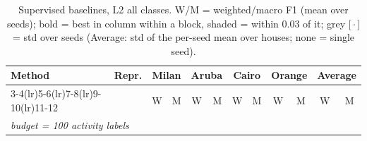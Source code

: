 \begin{table}[H]
\centering\small
\caption{Supervised baselines, L2 all classes. W/M = weighted/macro F1 (mean over seeds); bold = best in column within a block, shaded = within 0.03 of it; grey [\,$\cdot$\,] = std over seeds (Average: std of the per-seed mean over houses; none = single seed).}
\label{tab:base_l2_all}
\setlength{\tabcolsep}{3.2pt}
\begin{tabular}{llcc|cc|cc|cc|cc}
\toprule
Method & Repr. & \multicolumn{2}{c}{Milan} & \multicolumn{2}{c}{Aruba} & \multicolumn{2}{c}{Cairo} & \multicolumn{2}{c}{Orange} & \multicolumn{2}{c}{Average} \\
\cmidrule(lr){3-4}\cmidrule(lr){5-6}\cmidrule(lr){7-8}\cmidrule(lr){9-10}\cmidrule(lr){11-12}
 & & W & M & W & M & W & M & W & M & W & M \\
\midrule
\multicolumn{12}{l}{\textit{budget = 100 activity labels}} \\
\midrule

\end{tabular}
\end{table}

